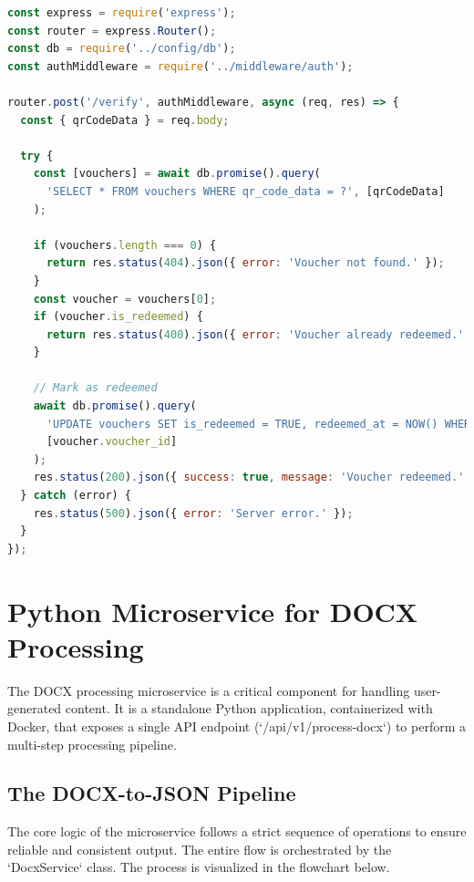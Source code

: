 \FloatBarrier
\begin{lstlisting}[language=JavaScript, caption={Express.js route for secure voucher verification.}]
const express = require('express');
const router = express.Router();
const db = require('../config/db');
const authMiddleware = require('../middleware/auth');

router.post('/verify', authMiddleware, async (req, res) => {
  const { qrCodeData } = req.body;

  try {
    const [vouchers] = await db.promise().query(
      'SELECT * FROM vouchers WHERE qr_code_data = ?', [qrCodeData]
    );

    if (vouchers.length === 0) {
      return res.status(404).json({ error: 'Voucher not found.' });
    }
    const voucher = vouchers[0];
    if (voucher.is_redeemed) {
      return res.status(400).json({ error: 'Voucher already redeemed.' });
    }

    // Mark as redeemed
    await db.promise().query(
      'UPDATE vouchers SET is_redeemed = TRUE, redeemed_at = NOW() WHERE voucher_id = ?',
      [voucher.voucher_id]
    );
    res.status(200).json({ success: true, message: 'Voucher redeemed.' });
  } catch (error) {
    res.status(500).json({ error: 'Server error.' });
  }
});
\end{lstlisting}
\FloatBarrier

\section{Python Microservice for DOCX Processing}
\label{sec:impl-python}
The DOCX processing microservice is a critical component for handling user-generated content. It is a standalone Python application, containerized with Docker, that exposes a single API endpoint (`/api/v1/process-docx`) to perform a multi-step processing pipeline.

\subsection{The DOCX-to-JSON Pipeline}
The core logic of the microservice follows a strict sequence of operations to ensure reliable and consistent output. The entire flow is orchestrated by the `DocxService` class. The process is visualized in the flowchart below.

